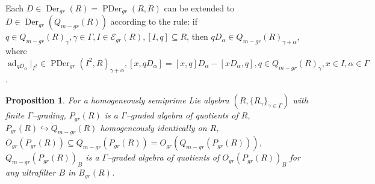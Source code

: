 \documentclass[a4paper,11pt]{article}
\newtheorem{prop}[defi]{Proposition}
\DeclareMathOperator{\ad}{ad}
\DeclareMathOperator{\Der}{Der}
\DeclareMathOperator{\PDer}{PDer}
\begin{document}
Each ${D\in \Der_{gr}(R)=\PDer_{gr}(R, R)}$ can be extended to 
${D\in \Der_{gr}(Q_{m-gr}(R))}$ according to the rule: if 
${q\in Q_{m-gr}(R)_{\gamma}, \gamma\in \Gamma, I\in \mathcal{E}_{gr}(R), 
[I, q]\subseteq R}$, then ${q D_{\alpha}\in Q_{m-gr}(R)_{\gamma+\alpha}}$, 
where ${\ad_{q D_{\alpha}}|_{I^2}\in \PDer_{gr}(I^2, R)_{\gamma+\alpha}, 
[x, q D_{\alpha}]=[x, q] D_{\alpha}-[x D_{\alpha}, q], 
q\in Q_{m-gr}(R)_{\gamma}, x\in I, \alpha\in \Gamma}$.

\begin{prop} 
For a homogeneously semiprime Lie algebra 
${(R, \{R_{\gamma}\}_{\gamma\in \Gamma})}$ with finite $\Gamma$--grading, 
$P_{gr}(R)$ is a $\Gamma$--graded algebra of quotients of
$R$, ${P_{gr}(R)\hookrightarrow Q_{m-gr}(R)}$ homogeneously  
identically on $R$, ${O_{gr}(P_{gr}(R))\subseteq Q_{m-gr}(P_{gr}(R))=
O_{gr}(Q_{m-gr}(P_{gr}(R)))}$, $Q_{m-gr}(P_{gr}(R))_B$ is a 
$\Gamma$--graded algebra of quotients of $O_{gr}(P_{gr}(R))_B$ for any 
ultrafilter $B$ in $B_{gr}(R)$. 
\end{prop}
\end{document}
